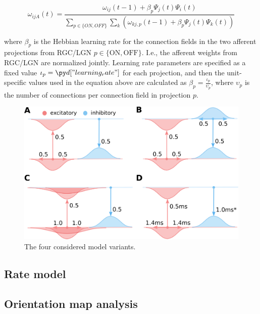 \documentclass[a4paper,10pt]{article}
\begin{document}
\begin{equation}
\omega_{ijA}(t)=\frac{\omega_{ij}(t-1)+\beta_{p}\Psi_{j}(t)\Psi_{i}(t)}{\sum_{p \in \{ON,OFF\}}\sum_{k}\left(\omega_{kj,p}(t-1)+\beta_{p}\Psi_{j}(t)\Psi_{k}(t)\right)}
\end{equation}

where $\beta_{p}$ is the Hebbian learning rate for the connection fields in the two afferent projections from RGC/LGN $p \in \{\mathrm{ON},\mathrm{OFF}\}$. I.e., the afferent weights from RGC/LGN are normalized jointly.  Learning rate parameters are specified as
a fixed value $\iota_{p}=\insval{learning_rate}$ for each projection, and then the unit-specific values used in the equation above are calculated as
$\beta_{p}=\frac{\iota_{p}}{\upsilon_{p}}$, where $\upsilon_{p}$ is the number of connections per connection field in projection $p$.  


\begin{figure}[htpb!] 
\centering
\includegraphics[width=16cm]{./SVG/FigureModelVariants/drawing.png}
\caption{The four considered model variants. }
\label{fig:model_architecture}
\end{figure} 


\subsection{Rate model}



\subsection{Orientation map analysis}
\end{document}
